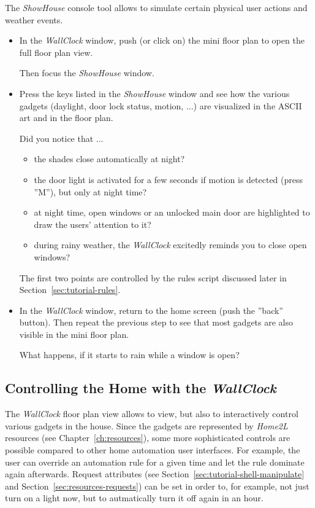 \documentclass[12pt,english,parskip=half,headheight=19pt]{scrreprt}
\begin{document}
The \textit{ShowHouse} console tool allows to simulate certain physical user actions and weather events.

\begin{itemize}[$\blacktriangleright$]

  \item
    In the \textit{WallClock} window, push (or click on) the mini floor plan to open the full floor
    plan view.

    Then focus the \textit{ShowHouse} window.

  \item
    Press the keys listed in the \textit{ShowHouse} window and see how the various gadgets
    (daylight, door lock status, motion, ...) are visualized in the ASCII art and in the floor plan.

    Did you notice that ...
    \begin{itemize}
      \item the shades close automatically at night?
      \item the door light is activated for a few seconds if motion is detected (press ''M''),
        but only at night time?
      \item at night time, open windows or an unlocked main door are highlighted to draw the
        users' attention to it?
      \item during rainy weather, the \textit{WallClock} excitedly reminds you to close open windows?
    \end{itemize}

    The first two points are controlled by the rules script discussed later in
    Section~\ref{sec:tutorial-rules}.

  \item
    In the \textit{WallClock} window, return to the home screen (push the ''back'' button).
    Then repeat the previous step to see that most gadgets are also visible in the
    mini floor plan.

    What happens, if it starts to rain while a window is open?

\end{itemize}


\subsection{Controlling the Home with the \textit{WallClock}}
\label{sec:tutorial-firststeps-dialogs}

The \textit{WallClock} floor plan view allows to view, but also to interactively control various
gadgets in the house. Since the gadgets are represented by \textit{Home2L} resources
(see Chapter~\ref{ch:resources}), some more sophisticated controls are possible compared to other
home automation user interfaces. For example, the user can override an automation rule for a given time
and let the rule dominate again afterwards. Request attributes (see Section~\ref{sec:tutorial-shell-manipulate}
and Section~\ref{sec:resources-requests}) can be set in order to, for example, not just turn on a light now,
but to autmatically turn it off again in an hour.
\end{document}
